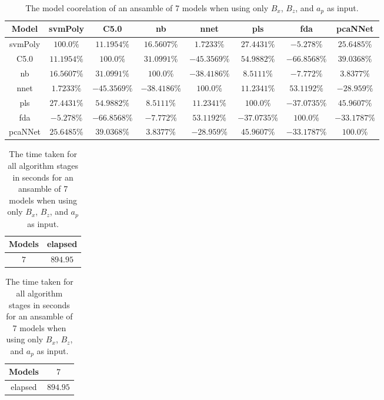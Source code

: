 \begin{table}[!ht]
	\centering
	\begin{tabular}{|c|c|c|c|c|c|c|c|}
		\hline
		Model & svmPoly & C5.0 & nb & nnet & pls & fda & pcaNNet \\ \hline
		svmPoly & $100.0\%$ & $11.1954\%$ & $16.5607\%$ & $1.7233\%$ & $27.4431\%$ & $-5.278\%$ & $25.6485\%$ \\ \hline
		C5.0 & $11.1954\%$ & $100.0\%$ & $31.0991\%$ & $-45.3569\%$ & $54.9882\%$ & $-66.8568\%$ & $39.0368\%$ \\ \hline
		nb & $16.5607\%$ & $31.0991\%$ & $100.0\%$ & $-38.4186\%$ & $8.5111\%$ & $-7.772\%$ & $3.8377\%$ \\ \hline
		nnet & $1.7233\%$ & $-45.3569\%$ & $-38.4186\%$ & $100.0\%$ & $11.2341\%$ & $53.1192\%$ & $-28.959\%$ \\ \hline
		pls & $27.4431\%$ & $54.9882\%$ & $8.5111\%$ & $11.2341\%$ & $100.0\%$ & $-37.0735\%$ & $45.9607\%$ \\ \hline
		fda & $-5.278\%$ & $-66.8568\%$ & $-7.772\%$ & $53.1192\%$ & $-37.0735\%$ & $100.0\%$ & $-33.1787\%$ \\ \hline
		pcaNNet & $25.6485\%$ & $39.0368\%$ & $3.8377\%$ & $-28.959\%$ & $45.9607\%$ & $-33.1787\%$ & $100.0\%$ \\ \hline
	\end{tabular}
	\caption{The model coorelation of an ansamble of 7 models when using only $B_{x}$, $B_{z}$, and $a_{p}$ as input.}
	\label{tab:ansamble7:xzap}
\end{table}

\begin{table}[!ht]
	\centering
	\begin{tabular}{|c|c|}
		\hline
		Models & elapsed \\ \hline
		$7$ & $894.95$ \\ \hline
	\end{tabular}
	\caption{The time taken for all algorithm stages in seconds for an ansamble of 7 models when using only $B_{x}$, $B_{z}$, and $a_{p}$ as input.}
	\label{tab:time:ansamble:xzap:7}
\end{table}

\begin{table}[!ht]
	\centering
	\begin{tabular}{|c|c|}
		\hline
		Models & $7$ \\ \hline
		elapsed & $894.95$ \\ \hline
	\end{tabular}
	\caption{The time taken for all algorithm stages in seconds for an ansamble of 7 models when using only $B_{x}$, $B_{z}$, and $a_{p}$ as input.}
	\label{tab:time:ansamble:reverse:xzap:7}
\end{table}

